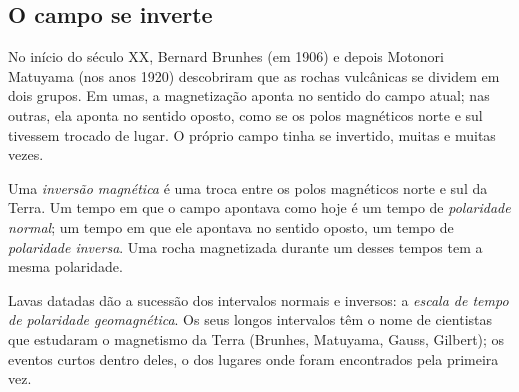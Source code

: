 \subsection{O campo se inverte}

No início do século XX, Bernard Brunhes (em 1906) e depois Motonori Matuyama
(nos anos 1920) descobriram que as rochas vulcânicas se dividem em dois
grupos. Em umas, a magnetização aponta no sentido do campo atual; nas
outras, ela aponta no sentido oposto, como se os polos magnéticos norte e
sul tivessem trocado de lugar. O próprio campo tinha se invertido, muitas e
muitas vezes.

\begin{definition}\label{def:g11:drift-to-spreading:reversal}
Uma \emph{inversão magnética} é
uma troca entre os polos magnéticos norte e sul da Terra. Um tempo em que o
campo apontava como hoje é um tempo de \emph{polaridade
normal}; um tempo em que ele apontava no sentido
oposto, um tempo de \emph{polaridade inversa}. Uma
rocha magnetizada durante um desses tempos tem a mesma polaridade.
\end{definition}

Lavas datadas dão a sucessão dos intervalos normais e inversos: a
\emph{escala de tempo de polaridade geomagnética}. Os seus longos intervalos
têm o nome de cientistas que estudaram o magnetismo da Terra (Brunhes,
Matuyama, Gauss, Gilbert); os eventos curtos dentro deles, o dos lugares
onde foram encontrados pela primeira vez.

